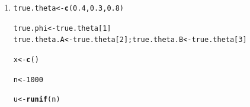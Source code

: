 \documentclass[11pt, a4paper]{article}\usepackage[]{graphicx}\usepackage[]{xcolor}
\makeatletter
\newcommand{\hlnum}[1]{\textcolor[rgb]{0.686,0.059,0.569}{#1}}%
\newcommand{\hldef}[1]{\textcolor[rgb]{0.345,0.345,0.345}{#1}}%
\newcommand{\hlkwb}[1]{\textcolor[rgb]{0.69,0.353,0.396}{#1}}%
\newcommand{\hlkwd}[1]{\textcolor[rgb]{0.737,0.353,0.396}{\textbf{#1}}}%
\newenvironment{kframe}{%
 \def\at@end@of@kframe{}%
 \ifinner\ifhmode%
  \def\at@end@of@kframe{\end{minipage}}%
  \begin{minipage}{\columnwidth}%
 \fi\fi%
 \def\FrameCommand##1{\hskip\@totalleftmargin \hskip-\fboxsep
 \colorbox{shadecolor}{##1}\hskip-\fboxsep
     \hskip-\linewidth \hskip-\@totalleftmargin \hskip\columnwidth}%
 \MakeFramed {\advance\hsize-\width
   \@totalleftmargin\z@ \linewidth\hsize
   \@setminipage}}%
 {\par\unskip\endMakeFramed%
 \at@end@of@kframe}
\newenvironment{knitrout}{}{} %
\makeatother
\begin{document}
\begin{enumerate}

\item[\scalebox{2.0}{\twemoji{keycap: 1}}]

\begin{knitrout}
\color{fgcolor}\begin{kframe}
\begin{alltt}
\hldef{true.theta} \hlkwb{<-} \hlkwd{c}\hldef{(}\hlnum{0.4}\hldef{,} \hlnum{0.3}\hldef{,} \hlnum{0.8}\hldef{)}
\end{alltt}
\end{kframe}
\end{knitrout}

\begin{knitrout}
\color{fgcolor}\begin{kframe}
\begin{alltt}
\hldef{true.phi} \hlkwb{<-} \hldef{true.theta[}\hlnum{1}\hldef{]}
\hldef{true.theta.A} \hlkwb{<-} \hldef{true.theta[}\hlnum{2}\hldef{]; true.theta.B} \hlkwb{<-} \hldef{true.theta[}\hlnum{3}\hldef{]}
\end{alltt}
\end{kframe}
\end{knitrout}

\begin{knitrout}
\color{fgcolor}\begin{kframe}
\begin{alltt}
\hldef{x} \hlkwb{<-} \hlkwd{c}\hldef{()}
\end{alltt}
\end{kframe}
\end{knitrout}

\begin{knitrout}
\color{fgcolor}\begin{kframe}
\begin{alltt}
\hldef{n} \hlkwb{<-} \hlnum{1000}
\end{alltt}
\end{kframe}
\end{knitrout}

\begin{knitrout}
\color{fgcolor}\begin{kframe}
\begin{alltt}
\hldef{u} \hlkwb{<-} \hlkwd{runif}\hldef{(n)}
\end{alltt}
\end{kframe}
\end{knitrout}


\end{enumerate}
\end{document}
